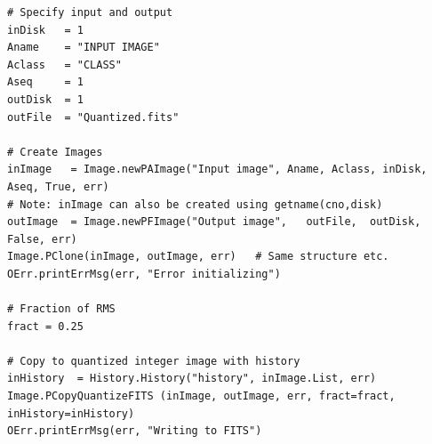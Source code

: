 \documentclass[11pt]{report}
\begin{document}
\begin{verbatim}
# Specify input and output
inDisk   = 1
Aname    = "INPUT IMAGE"
Aclass   = "CLASS"
Aseq     = 1
outDisk  = 1
outFile  = "Quantized.fits"

# Create Images
inImage   = Image.newPAImage("Input image", Aname, Aclass, inDisk, Aseq, True, err)
# Note: inImage can also be created using getname(cno,disk)
outImage  = Image.newPFImage("Output image",   outFile,  outDisk,  False, err)
Image.PClone(inImage, outImage, err)   # Same structure etc.
OErr.printErrMsg(err, "Error initializing")

# Fraction of RMS 
fract = 0.25

# Copy to quantized integer image with history
inHistory  = History.History("history", inImage.List, err)
Image.PCopyQuantizeFITS (inImage, outImage, err, fract=fract, inHistory=inHistory)
OErr.printErrMsg(err, "Writing to FITS")
\end{verbatim}

\end{document}
